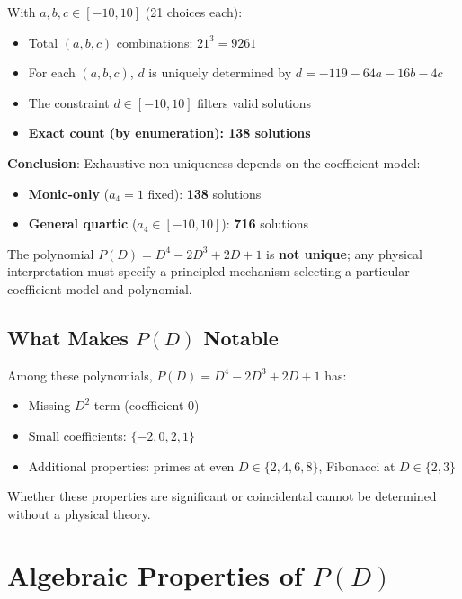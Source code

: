 \documentclass[11pt,a4paper]{article}
\begin{document}
With $a, b, c \in [-10, 10]$ (21 choices each):
\begin{itemize}
    \item Total $(a, b, c)$ combinations: $21^3 = 9261$
    \item For each $(a,b,c)$, $d$ is uniquely determined by $d = -119 - 64a - 16b - 4c$
    \item The constraint $d \in [-10, 10]$ filters valid solutions
    \item \textbf{Exact count (by enumeration): 138 solutions}
\end{itemize}

\textbf{Conclusion}: Exhaustive non-uniqueness depends on the coefficient model:
\begin{itemize}
    \item \textbf{Monic-only} ($a_4 = 1$ fixed): \textbf{138} solutions
    \item \textbf{General quartic} ($a_4 \in [-10,10]$): \textbf{716} solutions
\end{itemize}

The polynomial $P(D) = D^4 - 2D^3 + 2D + 1$ is \textbf{not unique}; any physical interpretation must specify a principled mechanism selecting a particular coefficient model and polynomial.

\subsection{What Makes $P(D)$ Notable}

Among these polynomials, $P(D) = D^4 - 2D^3 + 2D + 1$ has:
\begin{itemize}
    \item Missing $D^2$ term (coefficient 0)
    \item Small coefficients: $\{-2, 0, 2, 1\}$
    \item Additional properties: primes at even $D \in \{2,4,6,8\}$, Fibonacci at $D \in \{2,3\}$
\end{itemize}

Whether these properties are significant or coincidental cannot be determined without a physical theory.

\section{Algebraic Properties of $P(D)$}
\end{document}
